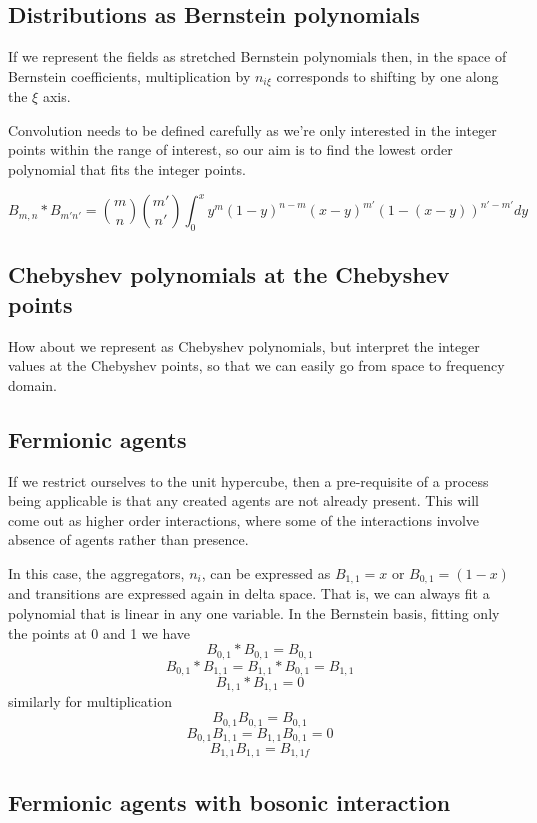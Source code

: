 \documentclass[a4paper]{article}
\begin{document}
\subsection{Distributions as Bernstein polynomials}
If we represent the fields as stretched Bernstein polynomials then, in the space of Bernstein coefficients, multiplication by $n_{i\xi}$ corresponds to shifting by one along the $\xi$ axis.

Convolution needs to be defined carefully as we're only interested in the integer points within the range of interest, so our aim is to find the lowest order polynomial that fits the integer points.

\[
B_{m,n} \ast B_{m'n'} =   {m \choose n}{m' \choose n'} \int_{0}^x y^m(1-y)^{n-m} (x-y)^{m'}(1-(x-y))^{n'-m'} dy
\]

\subsection{Chebyshev polynomials at the Chebyshev points}
How about we represent as Chebyshev polynomials, but interpret the integer values at the Chebyshev points, so that we can easily go from space to frequency domain.

\subsection{Fermionic agents}

If we restrict ourselves to the unit hypercube, then a pre-requisite of a process being applicable is that any created agents are not already present. This will come out as higher order interactions, where some of the interactions involve absence of agents rather than presence.

In this case, the aggregators, $n_i$, can be expressed as $B_{1,1}=x$ or $B_{0,1}=(1-x)$ and transitions are expressed again in delta space. That is, we can always fit a polynomial that is linear in any one variable. In the Bernstein basis, fitting only the points at 0 and 1 we have 
\[
B_{0,1} \ast B_{0,1} = B_{0,1}
\]
\[B_{0,1} \ast B_{1,1} = B_{1,1} \ast B_{0,1} = B_{1,1}\]
\[
B_{1,1} \ast B_{1,1} = 0
\]
similarly for multiplication
\[
B_{0,1}B_{0,1} = B_{0,1}
\]
\[
B_{0,1}B_{1,1} = B_{1,1}B_{0,1} = 0
\]
\[
B_{1,1}B_{1,1} = B_{1,1f}
\]

\subsection{Fermionic agents with bosonic interaction}
\end{document}

